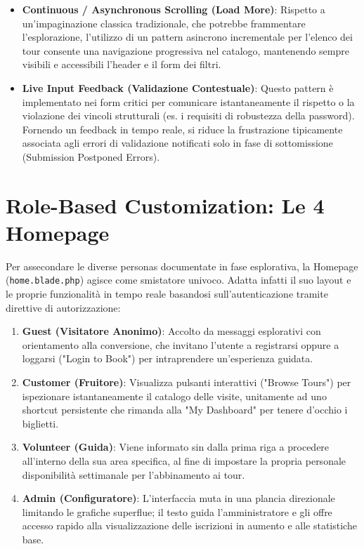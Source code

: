 \begin{itemize}
    \item \textbf{Continuous / Asynchronous Scrolling (Load More)}: Rispetto a un'impaginazione classica tradizionale, che potrebbe frammentare l'esplorazione, l'utilizzo di un pattern asincrono incrementale per l'elenco dei tour consente una navigazione progressiva nel catalogo, mantenendo sempre visibili e accessibili l'header e il form dei filtri.
    \item \textbf{Live Input Feedback (Validazione Contestuale)}: Questo pattern è implementato nei form critici per comunicare istantaneamente il rispetto o la violazione dei vincoli strutturali (es. i requisiti di robustezza della password). Fornendo un feedback in tempo reale, si riduce la frustrazione tipicamente associata agli errori di validazione notificati solo in fase di sottomissione (Submission Postponed Errors). 
\end{itemize}

\section{Role-Based Customization: Le 4 Homepage}
Per assecondare le diverse personas documentate in fase esplorativa, la Homepage (\texttt{home.blade.php}) agisce come smistatore univoco. Adatta infatti il suo layout e le proprie funzionalità in tempo reale basandosi sull'autenticazione tramite direttive di autorizzazione:
\begin{enumerate}
    \item \textbf{Guest (Visitatore Anonimo)}: Accolto da messaggi esplorativi con orientamento alla conversione, che invitano l'utente a registrarsi oppure a loggarsi ("Login to Book") per intraprendere un'esperienza guidata.
    \item \textbf{Customer (Fruitore)}: Visualizza pulsanti interattivi ("Browse Tours") per ispezionare istantaneamente il catalogo delle visite, unitamente ad uno shortcut persistente che rimanda alla "My Dashboard" per tenere d'occhio i biglietti.
    \item \textbf{Volunteer (Guida)}: Viene informato sin dalla prima riga a procedere all'interno della sua area specifica, al fine di impostare la propria personale disponibilità settimanale per l'abbinamento ai tour.
    \item \textbf{Admin (Configuratore)}: L'interfaccia muta in una plancia direzionale limitando le grafiche superflue; il testo guida l'amministratore e gli offre accesso rapido alla visualizzazione delle iscrizioni in aumento e alle statistiche base.
\end{enumerate}


